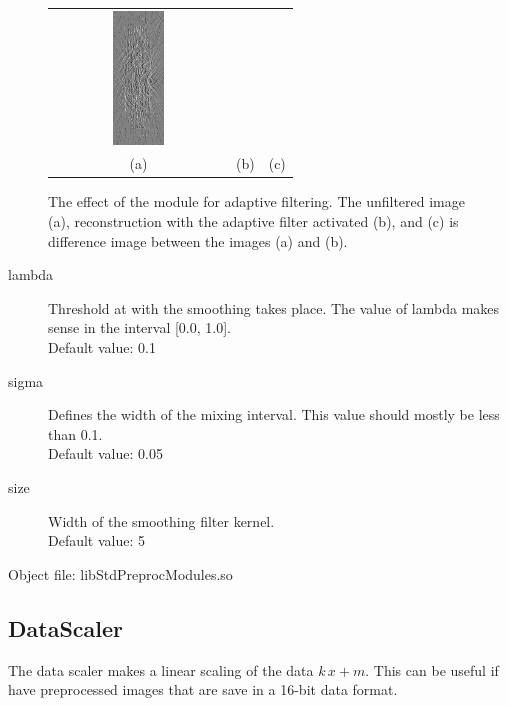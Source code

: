 \documentclass[a4paper]{scrreprt}
\begin{document}
\begin{figure}[ht!]
\begin{tabular}{ccc}
\includegraphics[angle=90, width=0.3\textwidth]{figures/adaptive_diff.png} \\
(a) & (b) & (c)
\end{tabular}
\caption{The effect of the module for adaptive filtering. The unfiltered image (a), reconstruction with the adaptive filter activated (b), and (c) is difference image between the images (a) and (b).}
\end{figure}
\begin{description}
 \item[lambda] Threshold at with the smoothing takes place. The value of lambda makes sense in the interval [0.0, 1.0]. \\Default value: 0.1
  \item[sigma] Defines the width of the mixing interval. This value should mostly be less than 0.1. \\Default value: 0.05
 \item[size] Width of the smoothing filter kernel. \\Default value: 5
\end{description}
Object file: libStdPreprocModules.so



\subsection{DataScaler}
The data scaler makes a linear scaling of the data $k\,x+m$. This can be useful if have preprocessed images that are save in a 16-bit data format.
\end{document}
